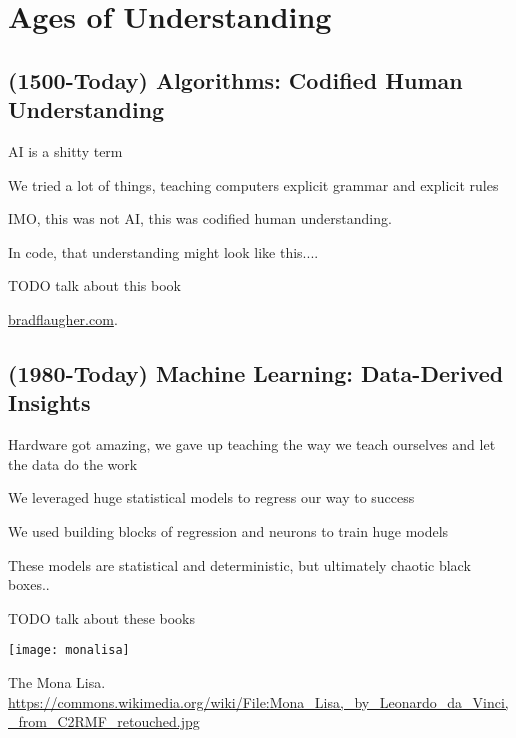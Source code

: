 \setchapterpreamble[u]{\margintoc}
\chapter{Ages of Understanding}

\section{(1500-Today) Algorithms: Codified Human Understanding}

AI is a shitty term

We tried a lot of things, teaching computers explicit grammar and explicit rules

IMO, this was not AI, this was codified human understanding.

In code, that understanding might look like this.... %

TODO talk about this book 

\href{https://bradflaugher.com}{bradflaugher.com}.  


\section{(1980-Today) Machine Learning: Data-Derived Insights}

Hardware got amazing, we gave up teaching the way we teach ourselves and let the data do the work

We leveraged huge statistical models to regress our way to success

We used building blocks of regression and neurons to train huge models

These models are statistical and deterministic, but ultimately chaotic black boxes..

TODO talk about these books \cite{MacAskill2022} \cite{Metz2022Sep} \cite{Metz2022Sep2} \cite{Aytekin}


\begin{marginfigure}[-5.5cm]
	\texttt{[image: monalisa]}
	\caption[The Mona Lisa]{The Mona Lisa.\\ 
	\url{https://commons.wikimedia.org/wiki/File:Mona_Lisa,_by_Leonardo_da_Vinci,_from_C2RMF_retouched.jpg}}
\end{marginfigure}
